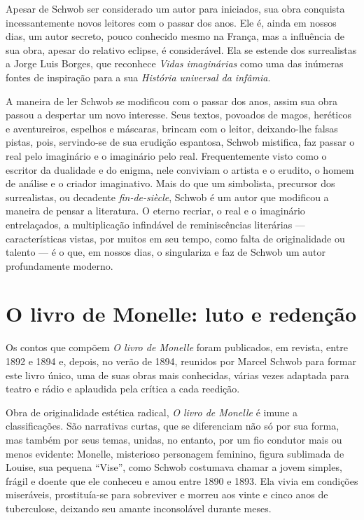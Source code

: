 Apesar de Schwob ser considerado um autor para iniciados, sua obra conquista
incessantemente novos leitores com o passar dos anos. Ele é, ainda em nossos
dias, um autor secreto, pouco conhecido mesmo na França, mas a influência de
sua obra, apesar do relativo eclipse, é considerável. Ela se estende
dos surrealistas a Jorge Luis Borges, que reconhece \textit{Vidas imaginárias}
como uma das inúmeras fontes de inspiração para a sua \textit{História
universal da infâmia}.

A maneira de ler Schwob se modificou com o passar dos anos, assim sua obra
passou a despertar um novo interesse. Seus textos, povoados de magos, heréticos
e aventureiros, espelhos e máscaras, brincam com o leitor, deixando-lhe falsas
pistas, pois, servindo-se de sua erudição espantosa, Schwob mistifica, faz
passar o real pelo imaginário e o imaginário pelo real. Frequentemente visto
como o escritor da dualidade e do enigma, nele conviviam o artista e o erudito,
o homem de análise e o criador imaginativo. Mais do que um simbolista,
precursor dos surrealistas, ou decadente \textit{fin-de-siècle}, Schwob é
um autor que modificou a maneira de pensar a literatura. O eterno
recriar, o real e o imaginário entrelaçados, a multiplicação infindável de
reminiscências literárias --- características vistas, por muitos em seu tempo,
como falta de originalidade ou talento --- é o que, em nossos dias, o singulariza
e faz de Schwob um autor profundamente moderno.


\section{O livro de Monelle: luto e redenção}


Os contos que compõem \textit{O livro de Monelle} foram publicados,
em revista, entre 1892 e 1894 e, depois, no verão de 1894, reunidos por Marcel
Schwob para formar este livro único, uma de suas obras mais conhecidas, várias
vezes adaptada para teatro e rádio e aplaudida pela crítica a cada reedição.

Obra de originalidade estética radical, \textit{O livro de Monelle} é imune
a classificações. São narrativas curtas, que se diferenciam não só por sua
forma, mas também por seus temas, unidas, no entanto, por um fio condutor
mais ou menos evidente: Monelle, misterioso personagem feminino, figura
sublimada de Louise, sua pequena “Vise”, como Schwob costumava chamar a
jovem simples, frágil e doente que ele conheceu e amou entre 1890 e 1893. Ela
vivia em condições miseráveis, prostituía-se para sobreviver e morreu aos vinte
e cinco anos de tuberculose, deixando seu amante inconsolável durante meses.

